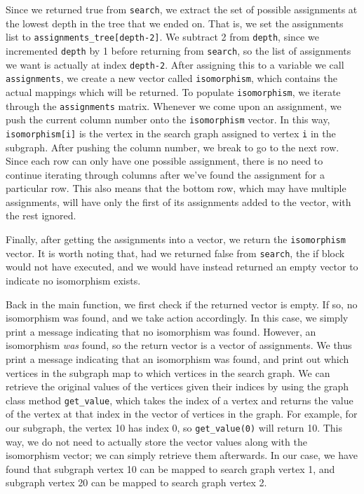 \documentclass{article}
\begin{document}
  Since we returned true from \texttt{search}, we extract the set of possible assignments at the lowest depth in the tree that we ended on. That is, we set the assignments list to \texttt{assignments\_tree[depth-2]}. We subtract 2 from \texttt{depth}, since we incremented \texttt{depth} by 1 before returning from \texttt{search}, so the list of assignments we want is actually at index \texttt{depth-2}. After assigning this to a variable we call \texttt{assignments}, we create a new vector called \texttt{isomorphism}, which contains the actual mappings which will be returned. To populate \texttt{isomorphism}, we iterate through the \texttt{assignments} matrix. Whenever we come upon an assignment, we push the current column number onto the \texttt{isomorphism} vector. In this way, \texttt{isomorphism[i]} is the vertex in the search graph assigned to vertex \texttt{i} in the subgraph. After pushing the column number, we break to go to the next row. Since each row can only have one possible assignment, there is no need to continue iterating through columns after we've found the assignment for a particular row. This also means that the bottom row, which may have multiple assignments, will have only the first of its assignments added to the vector, with the rest ignored.

  Finally, after getting the assignments into a vector, we return the \texttt{isomorphism} vector. It is worth noting that, had we returned false from \texttt{search}, the if block would not have executed, and we would have instead returned an empty vector to indicate no isomorphism exists.

  Back in the main function, we first check if the returned vector is empty. If so, no isomorphism was found, and we take action accordingly. In this case, we simply print a message indicating that no isomorphism was found. However, an isomorphism \textit{was} found, so the return vector is a vector of assignments. We thus print a message indicating that an isomorphism was found, and print out which vertices in the subgraph map to which vertices in the search graph. We can retrieve the original values of the vertices given their indices by using the graph class method \texttt{get\_value}, which takes the index of a vertex and returns the value of the vertex at that index in the vector of vertices in the graph. For example, for our subgraph, the vertex 10 has index 0, so \texttt{get\_value(0)} will return 10. This way, we do not need to actually store the vector values along with the isomorphism vector; we can simply retrieve them afterwards. In our case, we have found that subgraph vertex 10 can be mapped to search graph vertex 1, and subgraph vertex 20 can be mapped to search graph vertex 2. 
  
\end{document}
